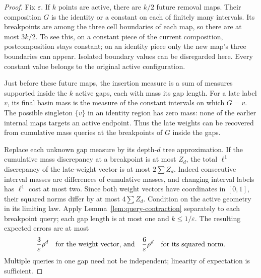 \documentclass[11pt,letterpaper]{article}
\begin{document}
\begin{proof}
Fix $\varepsilon$. If $k$ points are active, there are $k/2$ future
removal maps. Their composition $G$ is the identity or a constant on
each of finitely many intervals. Its breakpoints are among the three
cell boundaries of each map, so there are at most $3k/2$. To see this,
on a constant piece of the current composition, postcomposition stays
constant; on an identity piece only the new map's three boundaries can
appear. Isolated boundary values can be disregarded here.
Every constant value belongs to the original active configuration.

Just before these future maps, the insertion measure is a sum of measures
supported inside the $k$ active gaps, each with mass its gap length.
For a late label $v$, its final basin mass is the measure of the constant
intervals on which $G=v$. The possible singleton $\{v\}$ in an identity
region has zero mass: none of the earlier internal maps targets an
active endpoint. Thus the late weights can be recovered from cumulative
mass queries at the breakpoints of $G$ inside the gaps.

Replace each unknown gap measure by its depth-$d$ tree approximation.
If the cumulative mass discrepancy at a breakpoint is at most $Z_d$,
the total $\ell^1$ discrepancy of the late-weight vector is at most
$2\sum Z_d$. Indeed consecutive interval masses are differences of
cumulative masses, and changing interval labels has $\ell^1$ cost at
most two. Since both weight vectors have coordinates in $[0,1]$,
their squared norms differ by at most $4\sum Z_d$.
Condition on the active geometry in its limiting law. Apply
Lemma~\ref{lem:query-contraction} separately to each breakpoint query;
each gap length is at most one and $k\le1/\varepsilon$. The resulting
expected errors are at most
\[
 \frac3\varepsilon\rho^d
 \quad\hbox{for the weight vector, and}\quad
 \frac6\varepsilon\rho^d
 \quad\hbox{for its squared norm}.
\]
Multiple queries in one gap need not be independent; linearity of
expectation is sufficient.


\end{proof}
\end{document}
